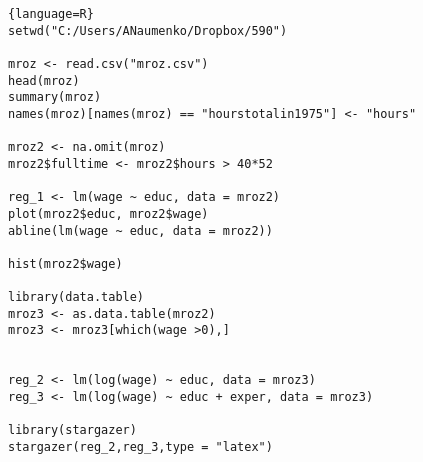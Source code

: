 \documentclass[12pt]{article}%
\begin{document}
\begin{lstlisting}{language=R}
setwd("C:/Users/ANaumenko/Dropbox/590")

mroz <- read.csv("mroz.csv")
head(mroz)
summary(mroz)
names(mroz)[names(mroz) == "hourstotalin1975"] <- "hours"

mroz2 <- na.omit(mroz)
mroz2$fulltime <- mroz2$hours > 40*52

reg_1 <- lm(wage ~ educ, data = mroz2)
plot(mroz2$educ, mroz2$wage)
abline(lm(wage ~ educ, data = mroz2))

hist(mroz2$wage)

library(data.table)
mroz3 <- as.data.table(mroz2)
mroz3 <- mroz3[which(wage >0),]


reg_2 <- lm(log(wage) ~ educ, data = mroz3) 
reg_3 <- lm(log(wage) ~ educ + exper, data = mroz3)

library(stargazer)
stargazer(reg_2,reg_3,type = "latex")

\end{lstlisting}
\end{document}
